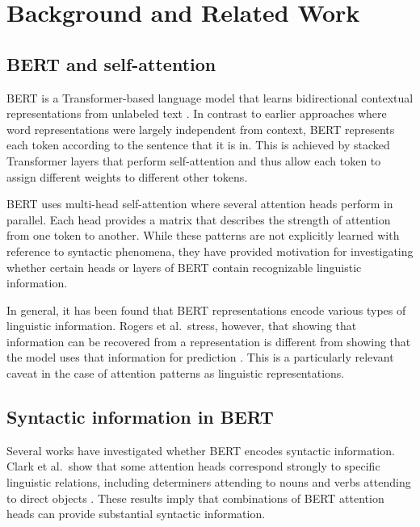 \documentclass[12pt,a4paper]{article}
\begin{document}

\section{Background and Related Work}

\subsection{BERT and self-attention}

BERT is a Transformer-based language model that learns bidirectional contextual representations from unlabeled text \cite{devlin2019bert}. In contrast to earlier approaches where word representations were largely independent from context, BERT represents each token according to the sentence that it is in. This is achieved by stacked Transformer layers that perform self-attention and thus allow each token to assign different weights to different other tokens.

BERT uses multi-head self-attention where several attention heads perform in parallel. Each head provides a matrix that describes the strength of attention from one token to another. While these patterns are not explicitly learned with reference to syntactic phenomena, they have provided motivation for investigating whether certain heads or layers of BERT contain recognizable linguistic information.

In general, it has been found that BERT representations encode various types of linguistic information. Rogers et al.\ stress, however, that showing that information can be recovered from a representation is different from showing that the model uses that information for prediction \cite{rogers2020primer}. This is a particularly relevant caveat in the case of attention patterns as linguistic representations.

\subsection{Syntactic information in BERT}

Several works have investigated whether BERT encodes syntactic information. Clark et al.\ show that some attention heads correspond strongly to specific linguistic relations, including determiners attending to nouns and verbs attending to direct objects \cite{clark2019what}. These results imply that combinations of BERT attention heads can provide substantial syntactic information.
\end{document}
